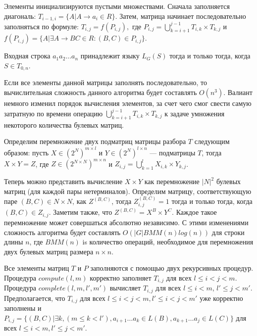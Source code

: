 \documentclass[14pt]{matmex-diploma-custom}
\begin{document}
Элементы инициализируются пустыми множествами.
Сначала заполняется диагональ: $T_{i - 1, i} = \{ A | A \rightarrow a_{i} \in R\}.$ 
Затем, матрица начинает последовательно заполняться по формуле:
$T_{i, j} = f(P_{i, j}),$ 
где $P_{i, j} = \bigcup\limits_{k = i + 1}^{j - 1} T_{i,k} \times T_{k, j}$ и
$f(P_{i, j}) = \{A | \exists A \rightarrow BC \in R : (B, C) \in P_{i, j}\}.$

Входная строка $a_{1}a_{2} \dots a_{n}$ принадлежит языку $L_{G}(S)$ тогда и только тогда, когда $S \in T_{0, n}$.

Если все элементы данной матрицы заполнять последовательно, то вычислительная сложность данного алгоритма будет составлять $O(n^3)$. Валиант немного изменил порядок вычисления элементов, за счет чего смог свести самую затратную по времени операцию $\bigcup\limits_{k = i + 1}^{j - 1} T_{i, k} \times T_{k, j}$ к задаче умножения некоторого количества булевых матриц.

Определим перемножение двух подматриц матрицы разбора $T$ следующим образом: пусть $X \in (2^N)^{m \times l}$ и $Y \in (2^N)^{l \times n}$ --- подматрицы $T$, тогда $X \times Y = Z$, где $Z \in (2^{N \times N})^{m \times n}$ и $Z_{i, j} = \bigcup\limits_{k = 1}^{l} X_{i, k} \times Y_{k, j}$.

Теперь можно представить вычисление $X \times Y$ как перемножение $|N|^2$ булевых матриц (для каждой пары нетерминалов).
Определим матрицу, соответствующую паре $(B, C) \in N \times N$, как $Z^{(B, C)}$, тогда $Z_{i, j}^{(B, C)} = 1$ тогда и только тогда, когда $(B, C) \in Z_{i, j}$.
Заметим также, что $Z^{(B, C)} = X^{B} \times Y^{C}$.
Каждое такое перемножение может совершаться абсолютно независимо.
С этими изменениями сложность алгоритма будет составлять $O(|G|BMM(n)log(n))$ для строки длины $n$, где $BMM(n)$ is количество операций, необходимое для перемножения двух булевых матриц размера $n \times n$.

Все элементы матриц $T$ и $P$ заполняются с помощью двух рекурсивных процедур.
Процедура $compute(l, m)$ корректно заполняет $T_{i,j}$ для всех $l \le i < j < m$.
Процедура $complete(l, m, l', m')$ вычисляет $T_{i, j}$ для всех $l \le i < m$, $l' \le j < m'$. Предполагается, что $T_{i, j}$ для всех $l \leq i < j < m,  l' \leq i < j < m'$ уже корректно заполнены и $P_{i, j} =  \{ (B, C) |\exists k, (m \le k < l'), a_{i + 1} \dots a_{k} \in L(B), a_{k + 1} \dots a_{j} \in L(C)\}$ для всех $l \leq i < m,  l' \leq j < m'$.
\end{document}
